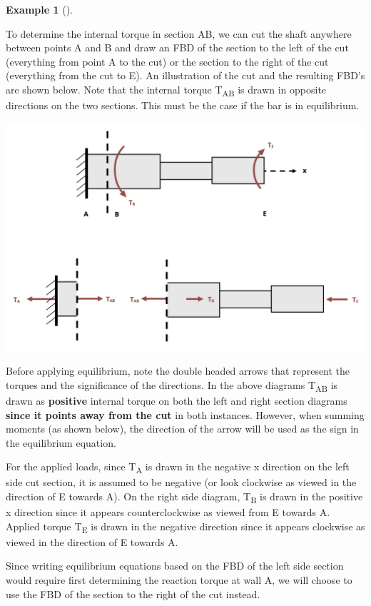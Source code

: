 \documentclass[
  letterpaper,
  DIV=11,
  numbers=noendperiod]{scrreprt}
\theoremstyle{definition}
\newtheorem{example}{Example}[chapter]
\theoremstyle{remark}
\begin{document}
\begin{tcolorbox}
\begin{example}[]
\begin{tcolorbox}
To determine the internal torque in section AB, we can cut the shaft
anywhere between points A and B and draw an FBD of the section to the
left of the cut (everything from point A to the cut) or the section to
the right of the cut (everything from the cut to E). An illustration of
the cut and the resulting FBD's are shown below. Note that the internal
torque T\textsubscript{AB} is drawn in opposite directions on the two
sections. This must be the case if the bar is in equilibrium.

\begin{center}
\includegraphics{images/CH6 PNGs/example 6.1 part 2.png}
\end{center}

Before applying equilibrium, note the double headed arrows that
represent the torques and the significance of the directions. In the
above diagrams T\textsubscript{AB} is drawn as \textbf{positive}
internal torque on both the left and right section diagrams
\textbf{since it points away from the cut} in both instances. However,
when summing moments (as shown below), the direction of the arrow will
be used as the sign in the equilibrium equation.

For the applied loads, since T\textsubscript{A} is drawn in the negative
x direction on the left side cut section, it is assumed to be negative
(or look clockwise as viewed in the direction of E towards A). On the
right side diagram, T\textsubscript{B} is drawn in the positive x
direction since it appears counterclockwise as viewed from E towards A.
Applied torque T\textsubscript{E} is drawn in the negative direction
since it appears clockwise as viewed in the direction of E towards A.

Since writing equilibrium equations based on the FBD of the left side
section would require first determining the reaction torque at wall A,
we will choose to use the FBD of the section to the right of the cut
instead.


\end{tcolorbox}
\end{example}
\end{tcolorbox}
\end{document}
